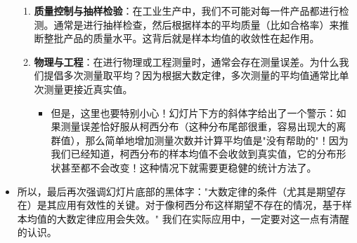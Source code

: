 \documentclass[UTF8]{article} %
\begin{document}
\begin{itemize}
\begin{enumerate}[label=\arabic*., itemsep=0.5em]
        \item \textbf{质量控制与抽样检验}：在工业生产中，我们不可能对每一件产品都进行检测。通常是进行抽样检查，然后根据样本的平均质量（比如合格率）来推断整批产品的质量水平。这背后就是样本均值的收敛性在起作用。
        \item \textbf{物理与工程}：在进行物理或工程测量时，通常会存在测量误差。为什么我们提倡多次测量取平均？因为根据大数定律，多次测量的平均值通常比单次测量更接近真实值。
            \begin{itemize}[label=\textbullet, itemsep=0.2em]
                \item 但是，这里也要特别小心！幻灯片下方的斜体字给出了一个警示：如果测量误差恰好服从柯西分布（这种分布尾部很重，容易出现大的离群值），那么简单地增加测量次数并计算平均值是"没有帮助的"！因为我们已经知道，柯西分布的样本均值不会收敛到真实值，它的分布形状甚至都不会改变！这种情况下就需要更稳健的统计方法了。
            \end{itemize}
    \end{enumerate}
    \item 所以，最后再次强调幻灯片底部的黑体字："大数定律的条件（尤其是期望存在）是其应用有效性的关键。对于像柯西分布这样期望不存在的情况，基于样本均值的大数定律应用会失效。" 我们在实际应用中，一定要对这一点有清醒的认识。
\end{itemize}
\end{document}
